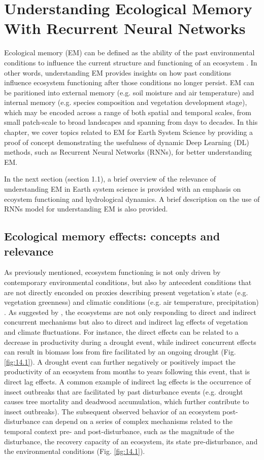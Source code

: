 
\chapter{Understanding Ecological Memory With Recurrent Neural Networks}

    Ecological memory (EM) can be defined as the ability of the past environmental conditions to influence the current structure and functioning of an ecosystem \cite{CR1,CR2}. In other words, understanding EM provides insights on how past conditions influence ecosystem functioning after those conditions no longer persist. EM can be paritioned into external memory (e.g. soil moisture and air temperature) and internal memory (e.g. species composition and vegetation development stage), which may be encoded across a range of both spatial and temporal scales, from small patch-scale to broad landscapes and spanning from days to decades. In this chapter, we cover topics related to EM for Earth System Science by providing a proof of concept demonstrating the usefulness of dynamic Deep Learning (DL) methods, such as Recurrent Neural Networks (RNNs), for better understanding EM. 

    In the next section (section 1.1), a brief overview of the relevance of understanding EM in Earth system science is provided with an emphasis on ecoystem functioning and hydrological dynamics. A brief description on the use of RNNs model for understanding EM is also provided. 

\section{Ecological memory effects: concepts and relevance} 

	As previously mentioned, ecosystem functioning is not only driven by contemporary environmental conditions, but also by antecedent conditions that are not directly enconded on proxies describing present vegetation's state (e.g. vegetation greenness) and climatic conditions (e.g. air temperature, precipitation) \citep{CR3}. As suggested by \citet{CR4}, the ecosystems are not only responding to direct and indirect concurrent mechanisms but also to direct and indirect lag effects of vegetation and climate fluctuations. For instance, the direct effects can be related to a decrease in productivity during a drought event, while indirect concurrent effects can result in biomass loss from fire facilitated by an ongoing drought (Fig. \ref{fig:14.1}). A drought event can further negatively or positively impact the productivity of an ecosystem from months to years following this event, that is direct lag effects. A common example of indirect lag effects is the occurrence of insect outbreaks that are facilitated by past disturbance events (e.g. drought causes tree mortality and deadwood accumulation, which further contribute to insect outbreaks). The subsequent observed behavior of an ecosystem post-disturbance can depend on a series of complex mechanisms related to the temporal context pre- and post-disturbance, such as the magnitude of the disturbance, the recovery capacity of an ecosystem, its state pre-disturbance, and the environmental conditions (Fig. \ref{fig:14.1}).

